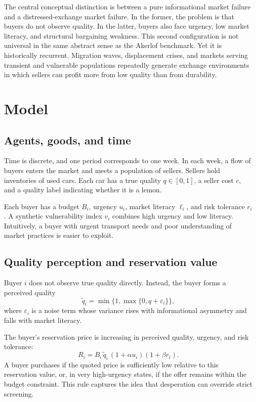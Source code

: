 \documentclass[12pt]{article}
\begin{document}
The central conceptual distinction is between a pure informational market failure and a distressed-exchange market failure. In the former, the problem is that buyers do not observe quality. In the latter, buyers also face urgency, low market literacy, and structural bargaining weakness. This second configuration is not universal in the same abstract sense as the Akerlof benchmark. Yet it is historically recurrent. Migration waves, displacement crises, and markets serving transient and vulnerable populations repeatedly generate exchange environments in which sellers can profit more from low quality than from durability.

\section{Model}

\subsection{Agents, goods, and time}

Time is discrete, and one period corresponds to one week. In each week, a flow of buyers enters the market and meets a population of sellers. Sellers hold inventories of used cars. Each car has a true quality $q \in [0,1]$, a seller cost $c$, and a quality label indicating whether it is a lemon.

Each buyer has a budget $B_i$, urgency $u_i$, market literacy $\ell_i$, and risk tolerance $r_i$. A synthetic vulnerability index $v_i$ combines high urgency and low literacy. Intuitively, a buyer with urgent transport needs and poor understanding of market practices is easier to exploit.

\subsection{Quality perception and reservation value}

Buyer $i$ does not observe true quality directly. Instead, the buyer forms a perceived quality
\begin{equation}
\tilde q_i = \min\{1, \max\{0, q + \varepsilon_i\}\},
\end{equation}
where $\varepsilon_i$ is a noise term whose variance rises with informational asymmetry and falls with market literacy.

The buyer's reservation price is increasing in perceived quality, urgency, and risk tolerance:
\begin{equation}
R_i = B_i \, \tilde q_i \, (1 + \alpha u_i)(1 + \beta r_i).
\end{equation}
A buyer purchases if the quoted price is sufficiently low relative to this reservation value, or, in very high-urgency states, if the offer remains within the budget constraint. This rule captures the idea that desperation can override strict screening.
\end{document}
